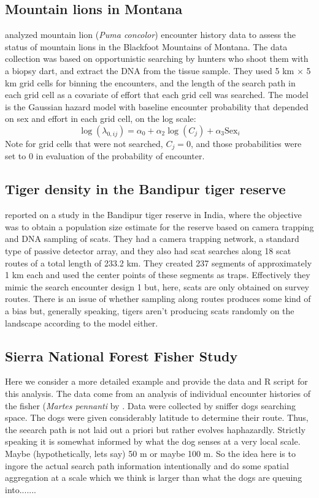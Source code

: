 \subsection{Mountain lions in Montana}

\citet{russell_etal:2012} analyzed mountain lion ({\it Puma concolor})
encounter history data to assess the status of mountain lions in the
Blackfoot Mountains of Montana.  The data collection was based on
opportunistic searching by hunters who shoot them with a
biopsy dart, and extract the DNA from the tissue sample. 
 They used 5 km $\times$ 5 km grid cells for
binning the encounters, and the length of the search path in each grid
cell as a covariate of effort that each grid cell was searched.  The
model is the Gaussian hazard model with baseline encounter probability
that depended on sex and effort in each grid cell, on the log scale:
\[
 \log(\lambda_{0,ij}) = \alpha_{0} + \alpha_{2} \log(C_{j}) + \alpha_{3} \mbox{Sex}_{i}
\]
Note for grid cells that were not searched, $C_{j} =0$, and those
probabilities were set to 0 in evaluation of the probability of
encounter.

\subsection{Tiger density in the Bandipur tiger reserve}

\citet{gopalaswamy_etal:2012ecol} reported on a study in the Bandipur
tiger reserve in India, where the objective was to obtain a population
size estimate for the reserve based on camera trapping and DNA
sampling of scats.  They had a camera trapping network, a standard
type of passive detector array, and they also had scat searches along
18 scat routes of a total length of 233.2 km. They created 237
segments of approximately 1 km each and used the center points of
these segments as traps. Effectively they mimic the search encounter
design 1 but, here, scats are only obtained on survey routes.
There is an issue of whether sampling along routes produces some kind
of a bias but, generally speaking, tigers aren't producing scats
randomly on the landscape according to the model either.

\subsection{Sierra National Forest Fisher Study}

Here we consider a more detailed example and provide the data and R
script for this analysis. 
The data come from an analysis of individual encounter histories of
the fisher ({\it Martes pennanti} by \citet{thompson_etal:2012}. Data
were collected by sniffer dogs searching space. The dogs were given
considerably latitude to determine their route.
Thus, the seearch path is not laid out a
priori but rather evolves haphazardly.  Strictly speaking it is
somewhat informed by what the dog senses at a very local scale. Maybe
(hypothetically, lets say) 
50 m or maybe 100 m.
So the idea here is to ingore the actual search path information
intentionally and do some spatial aggregation at a scale which we
think is larger than what the dogs are queuing into.......

